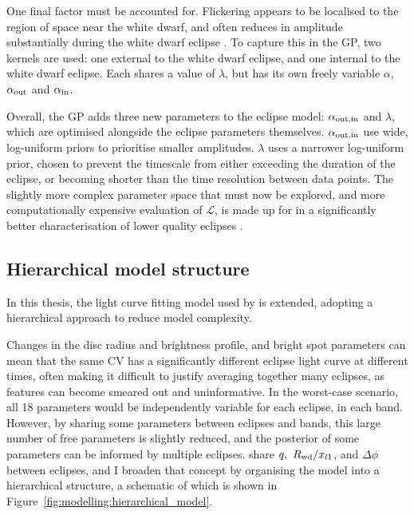 One final factor must be accounted for. Flickering appears to be localised to the region of space near the white dwarf, and often reduces in amplitude substantially during the white dwarf eclipse \citep{mcallister2017}.
To capture this in the GP, two kernels are used: one external to the white dwarf eclipse, and one internal to the white dwarf eclipse. Each shares a value of $\lambda$, but has its own freely variable $\alpha$, $\alpha_{\rm out}$ and $\alpha_{\rm in}$.

Overall, the GP adds three new parameters to the eclipse model: $\alpha_{\rm out, in}$ and $\lambda$, which are optimised alongside the eclipse parameters themselves. $\alpha_{\rm out, in}$ use wide, log-uniform priors to prioritise smaller amplitudes. $\lambda$ uses a narrower log-uniform prior, chosen to prevent the timescale from either exceeding the duration of the eclipse, or becoming shorter than the time resolution between data points.
The slightly more complex parameter space that must now be explored, and more computationally expensive evaluation of $\mathcal{L}$, is made up for in a significantly better characterisation of lower quality eclipses \citep{mcallister2017}.



\subsection{Hierarchical model structure}
\label{sect:modelling:optimising eclipse model parameters}

In this thesis, the light curve fitting model used by \citet{McAllister2019} is extended, adopting a hierarchical approach to reduce model complexity.

Changes in the disc radius and brightness profile, and bright spot parameters can mean that the same CV has a significantly different eclipse light curve at different times, often making it difficult to justify averaging together many eclipses, as features can become smeared out and uninformative. In the worst-case scenario, all 18 parameters would be independently variable for each eclipse, in each band. However, by sharing some parameters between eclipses and bands, this large number of free parameters is slightly reduced, and the posterior of some parameters can be informed by multiple eclipses. \citet{mcallister2017} share $q,\ R_{\rm wd} / x_{l1}$, and $\Delta\phi$ between eclipses, and I broaden that concept by organising the model into a hierarchical structure, a schematic of which is shown in Figure~\ref{fig:modelling:hierarchical_model}.

